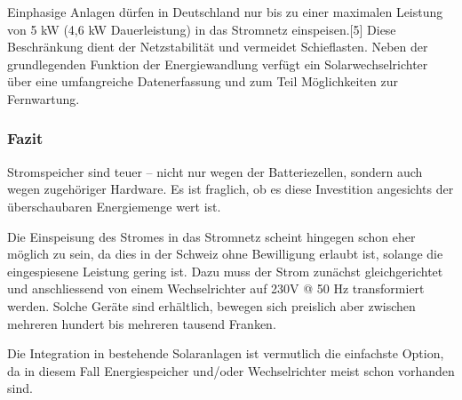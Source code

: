 \fi

Einphasige Anlagen dürfen in Deutschland nur bis zu einer maximalen Leistung von 5 \si{kW} (4,6 \si{kW} Dauerleistung) in das Stromnetz einspeisen.[5] Diese Beschränkung dient der Netzstabilität und vermeidet Schieflasten. Neben der grundlegenden Funktion der Energiewandlung verfügt ein Solarwechselrichter über eine umfangreiche Datenerfassung und zum Teil Möglichkeiten zur Fernwartung. 

\subsubsection{Fazit}

Stromspeicher sind teuer – nicht nur wegen der Batteriezellen, sondern auch wegen zugehöriger Hardware. Es ist fraglich, ob es diese Investition angesichts der überschaubaren Energiemenge wert ist. 

Die Einspeisung des Stromes in das Stromnetz scheint hingegen schon eher möglich zu sein, da dies in der Schweiz ohne Bewilligung erlaubt ist, solange die eingespiesene Leistung gering ist. Dazu muss der Strom zunächst gleichgerichtet und anschliessend von einem Wechselrichter auf 230\si{V} @ 50 \si{Hz} transformiert werden. Solche Geräte sind erhältlich, bewegen sich preislich aber zwischen mehreren hundert bis mehreren tausend Franken.

Die Integration in bestehende Solaranlagen ist vermutlich die einfachste Option, da in diesem Fall Energiespeicher und/oder Wechselrichter meist schon vorhanden sind.


\clearpage 